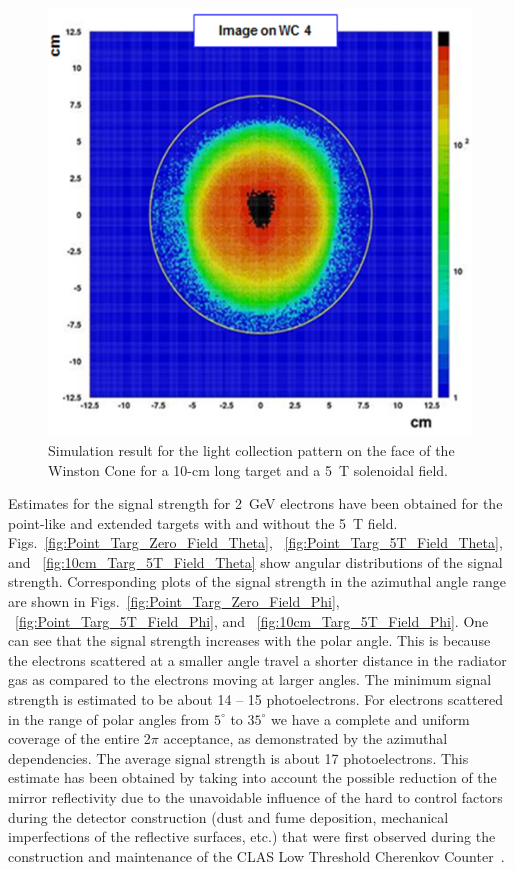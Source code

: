 \begin{figure}[!ht]
    \centering
    \includegraphics[width=1.0\linewidth,trim={0.0cm 0.0cm 0.0cm 0.0cm},clip]{images/10cm_Targ_5T_Field_WCone.png}
    \caption{Simulation result for the light collection pattern on the face of the Winston Cone for a 10-cm long target
      and a 5~T solenoidal field.}
    \label{fig:10cm_Targ_5T_Field_WCone}
\end{figure}

Estimates for the signal strength for 2~GeV electrons have been obtained for the point-like and extended targets
with and without the 5~T field. Figs.~\ref{fig:Point_Targ_Zero_Field_Theta}, 
~\ref{fig:Point_Targ_5T_Field_Theta}, and ~\ref{fig:10cm_Targ_5T_Field_Theta} show angular distributions of
the signal strength. Corresponding plots of the signal strength in the azimuthal angle range are shown in
Figs.~\ref{fig:Point_Targ_Zero_Field_Phi}, ~\ref{fig:Point_Targ_5T_Field_Phi}, and 
~\ref{fig:10cm_Targ_5T_Field_Phi}. One can see that the signal strength increases with the polar angle. This
is because the electrons scattered at a smaller angle travel a shorter distance in the radiator gas as compared to
the electrons moving at larger angles. The minimum signal strength is estimated to be about 14 – 15 photoelectrons.
For electrons scattered in the range of polar angles from $5^\circ$ to $35^\circ$ we have a complete and uniform
coverage of the entire 2$\pi$ acceptance, as demonstrated by the azimuthal dependencies. The average signal
strength is about 17 photoelectrons. This estimate has been obtained by taking into account the possible reduction of
the mirror reflectivity due to the unavoidable influence of the hard to control factors during the detector construction
(dust and fume deposition, mechanical imperfections of the reflective surfaces, etc.) that were first observed during
the construction and maintenance of the CLAS Low Threshold Cherenkov Counter~\cite{Adams:2001kk}.


